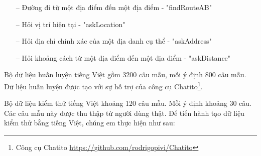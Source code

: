 \begin{itemize}
    \item[--] Đường đi từ một địa điểm đến một địa điểm - "findRouteAB"
    \item[--] Hỏi vị trí hiện tại - "askLocation"
    \item[--] Hỏi địa chỉ chính xác của một địa danh cụ thể - "askAddress"
    \item[--] Hỏi khoảng cách từ một địa điểm đến một địa điểm - "askDistance"
\end{itemize}

Bộ dữ liệu huấn luyện tiếng Việt gồm 3200 câu mẫu, mỗi ý định 800 câu mẫu. Dữ liệu huấn luyện được tạo với sự hỗ trợ của công cụ Chatito\footnote{Công cụ Chatito \url{https://github.com/rodrigopivi/Chatito}}.

Bộ dữ liệu kiểm thử tiếng Việt khoảng 120 câu mẫu. Mỗi ý định khoảng 30 câu. Các câu mẫu này được thu thập từ người dùng thật. Để tiến hành tạo dữ liệu kiểm thử bằng tiếng Việt, chúng em thực hiện như sau:

